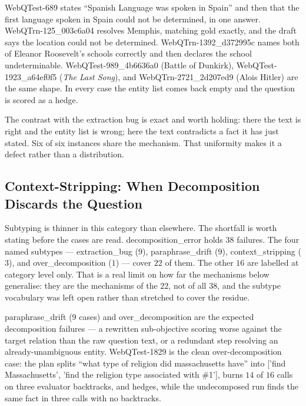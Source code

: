 \textsf{WebQTest-689} states ``Spanish Language was spoken in Spain'' and then
that the first language spoken in Spain could not be determined, in one answer.
\textsf{WebQTrn-125\_003c6a04} resolves \textsf{Memphis}, matching gold exactly,
and the draft says the location could not be determined.
\textsf{WebQTrn-1392\_d372995c} names both of Eleanor Roosevelt's schools
correctly and then declares the school undeterminable.
\textsf{WebQTest-989\_4b6636a0} (Battle of Dunkirk),
\textsf{WebQTest-1923\_a64ef0f5} (\emph{The Last Song}), and
\textsf{WebQTrn-2721\_2d207ed9} (\textsf{Alois Hitler}) are the same shape. In
every case the entity list comes back empty and the question is scored as a
hedge.

The contrast with the extraction bug is exact and worth holding: there the text
is right and the entity list is wrong; here the text contradicts a fact it has
just stated. Six of six instances share the mechanism. That uniformity makes it
a defect rather than a distribution.

\subsection{Context-Stripping: When Decomposition Discards the Question}

Subtyping is thinner in this category than elsewhere. The shortfall is
worth stating before the cases are read.
\textsf{decomposition\_error} holds $38$ failures. The four named subtypes ---
\textsf{extraction\_bug} ($9$), \textsf{paraphrase\_drift} ($9$),
\textsf{context\_stripping} ($3$), and \textsf{over\_decomposition} ($1$) ---
cover $22$ of them. The other $16$ are labelled at category level only. That is
a real limit on how far the mechanisms below generalise: they are the mechanisms
of the $22$, not of all $38$, and the subtype vocabulary was left open rather
than stretched to cover the residue.

\textsf{paraphrase\_drift} ($9$ cases) and \textsf{over\_decomposition} are the
expected decomposition failures --- a rewritten sub-objective scoring worse
against the target relation than the raw question text, or a redundant step
resolving an already-unambiguous entity. \textsf{WebQTest-1829} is the clean
over-decomposition case: the plan splits ``what type of religion did
massachusetts have'' into \textsf{['find Massachusetts', 'find the religion type
associated with \#1']}, burns $14$ of $16$ calls on three evaluator backtracks,
and hedges, while the undecomposed run finds the same fact in three calls with
no backtracks.

